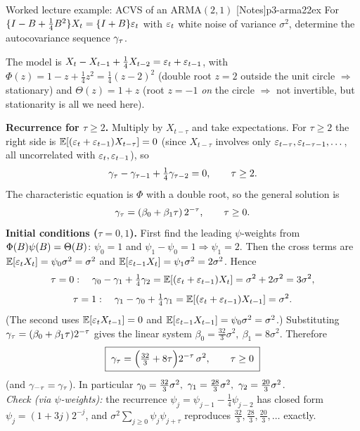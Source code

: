 \begin{exercise}{Worked lecture example: ACVS of an $\mathrm{ARMA}(2,1)$ \quad\textnormal{[Notes]}}{p3-arma22ex}
For $\{I-B+\tfrac14B^2\}X_t=\{I+B\}\varepsilon_t$ with $\varepsilon_t$ white noise of
variance $\sigma^2$, determine the autocovariance sequence $\gamma_\tau$.
\end{exercise}
\begin{solution}
The model is $X_t-X_{t-1}+\tfrac14 X_{t-2}=\varepsilon_t+\varepsilon_{t-1}$, with
$\Phi(z)=1-z+\tfrac14 z^2=\tfrac14(z-2)^2$ (double root $z=2$ outside the unit
circle $\Rightarrow$ stationary) and $\Theta(z)=1+z$ (root $z=-1$ \emph{on} the
circle $\Rightarrow$ not invertible, but stationarity is all we need here).

\textbf{Recurrence for $\tau\ge2$.} Multiply by $X_{t-\tau}$ and take
expectations. For $\tau\ge2$ the right side is
$\mathbb{E}[(\varepsilon_t+\varepsilon_{t-1})X_{t-\tau}]=0$ (since $X_{t-\tau}$ involves only
$\varepsilon_{t-\tau},\varepsilon_{t-\tau-1},\dots$, all uncorrelated with $\varepsilon_t,\varepsilon_{t-1}$),
so
\[
\gamma_\tau-\gamma_{\tau-1}+\tfrac14\gamma_{\tau-2}=0,\qquad \tau\ge2 .
\]
The characteristic equation is $\Phi$ with a double root, so the general
solution is
\[
\gamma_\tau=(\beta_0+\beta_1\tau)\,2^{-\tau},\qquad \tau\ge0 .
\]
\textbf{Initial conditions ($\tau=0,1$).} First find the leading $\psi$-weights
from $\Phi(B)\psi(B)=\Theta(B)$: $\psi_0=1$ and
$\psi_1-\psi_0=1\Rightarrow\psi_1=2$. Then the cross terms are
$\mathbb{E}[\varepsilon_t X_t]=\psi_0\sigma^2=\sigma^2$ and
$\mathbb{E}[\varepsilon_{t-1}X_t]=\psi_1\sigma^2=2\sigma^2$. Hence
\[
\tau=0:\quad \gamma_0-\gamma_1+\tfrac14\gamma_2=\mathbb{E}[(\varepsilon_t+\varepsilon_{t-1})X_t]=\sigma^2+2\sigma^2=3\sigma^2,
\]
\[
\tau=1:\quad \gamma_1-\gamma_0+\tfrac14\gamma_1=\mathbb{E}[(\varepsilon_t+\varepsilon_{t-1})X_{t-1}]=\sigma^2 .
\]
(The second uses $\mathbb{E}[\varepsilon_t X_{t-1}]=0$ and
$\mathbb{E}[\varepsilon_{t-1}X_{t-1}]=\psi_0\sigma^2=\sigma^2$.) Substituting
$\gamma_\tau=(\beta_0+\beta_1\tau)2^{-\tau}$ gives the linear system
$\beta_0=\tfrac{32}{3}\sigma^2,\ \beta_1=8\sigma^2$. Therefore
\[
\boxed{\;\gamma_\tau=\Big(\tfrac{32}{3}+8\tau\Big)2^{-\tau}\,\sigma^2,\qquad \tau\ge0\;}
\]
(and $\gamma_{-\tau}=\gamma_\tau$). In particular
$\acvs_0=\tfrac{32}{3}\sigma^2,\ \acvs_1=\tfrac{28}{3}\sigma^2,\ \acvs_2=\tfrac{20}{3}\sigma^2$.\\
\textit{Check (via $\psi$-weights):} the recurrence
$\psi_j=\psi_{j-1}-\tfrac14\psi_{j-2}$ has closed form $\psi_j=(1+3j)2^{-j}$, and
$\sigma^2\sum_{j\ge0}\psi_j\psi_{j+\tau}$ reproduces
$\tfrac{32}{3},\tfrac{28}{3},\tfrac{20}{3},\dots$ exactly.
\end{solution}

